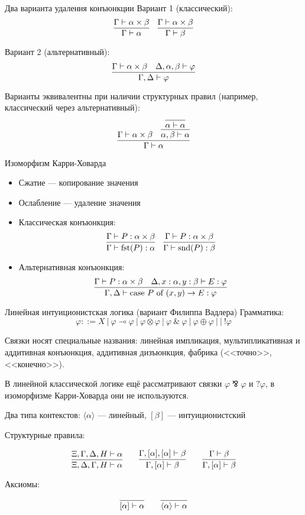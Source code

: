 \documentclass[aspectratio=169,dvipsnames,usenames]{beamer}
\begin{document}
\begin{frame}{Два варианта удаления конъюнкции}
Вариант 1 (классический):
$$\infer{\Gamma\vdash\alpha}{\Gamma\vdash\alpha\times\beta}\quad\infer{\Gamma\vdash\beta}{\Gamma\vdash\alpha\times\beta}$$

Вариант 2 (альтернативный):
$$\infer{\Gamma,\Delta\vdash\varphi}{\Gamma\vdash\alpha\times\beta\quad\Delta,\alpha,\beta\vdash\varphi}$$

Варианты эквивалентны при наличии структурных правил (например, классический через альтернативный):
$$\infer{\Gamma\vdash\alpha}{\Gamma\vdash\alpha\times\beta\quad\infer{\alpha,\beta\vdash\alpha}{\infer{\alpha\vdash\alpha}{}}}
$$
\end{frame}

\begin{frame}{Изоморфизм Карри-Ховарда}
\begin{itemize}
\item Сжатие --- копирование значения
\item Ослабление --- удаление значения
\item Классическая конъюнкция:
$$\infer{\Gamma\vdash \text{fst}(P):\alpha}{\Gamma\vdash P:\alpha\times\beta}\quad\infer{\Gamma\vdash \text{snd}(P):\beta}{\Gamma\vdash P:\alpha\times\beta}$$

\item Альтернативная конъюнкция:
$$\infer{\Gamma,\Delta\vdash \text{case } P \text{ of }(x,y) \rightarrow E : \varphi}{\Gamma\vdash P:\alpha\times\beta\quad\Delta, x: \alpha, y: \beta\vdash E:\varphi}$$
\end{itemize}
\end{frame}

\begin{frame}{Линейная интуиционистская логика (вариант Филиппа Вадлера)}
Грамматика:
$$\varphi ::= X\ |\ \varphi\multimap\varphi\ |\ \varphi\otimes\varphi\ |\ \varphi\ \&\ \varphi\ |\ \varphi\oplus\varphi\ |\ |\ !\varphi$$

Связки носят специальные названия: линейная импликация, мультипликативная и аддитивная конъюнкция, аддитивная дизъюнкция, фабрика (<<точно>>, <<конечно>>).

В линейной классической логике ещё рассматривают связки $\varphi\bindnasrepma\varphi$ и $?\varphi$, в изоморфизме Карри-Ховарда они не используются.

Два типа контекстов:
$\langle \alpha \rangle$ --- линейный,
$[\beta]$ --- интуиционистский

Структурные правила:

$$\infer{\Xi,\Delta,\Gamma,H\vdash\alpha}{\Xi,\Gamma,\Delta,H\vdash\alpha}\quad\quad
  \infer{\Gamma,[\alpha]\vdash\beta}{\Gamma,[\alpha],[\alpha]\vdash\beta}\quad\quad
  \infer{\Gamma,[\alpha]\vdash\beta}{\Gamma\vdash\beta}$$

Аксиомы:

$$\infer{[\alpha]\vdash\alpha}{}\quad\quad\infer{\langle\alpha\rangle\vdash\alpha}{}$$


\end{frame}
\end{document}
